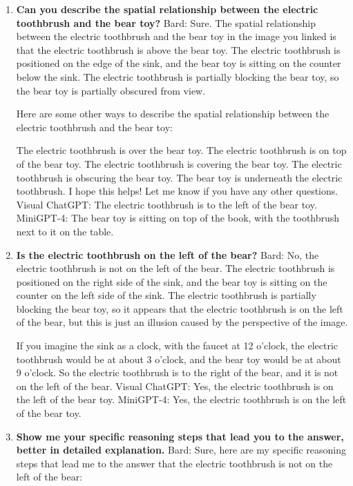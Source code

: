     \begin{enumerate}
        \item \textbf{Can you describe the spatial relationship between the electric toothbrush and the bear toy?}
        \subitem Bard: Sure. The spatial relationship between the electric toothbrush and the bear toy in the image you linked is that the electric toothbrush is above the bear toy. The electric toothbrush is positioned on the edge of the sink, and the bear toy is sitting on the counter below the sink. The electric toothbrush is partially blocking the bear toy, so the bear toy is partially obscured from view.

        Here are some other ways to describe the spatial relationship between the electric toothbrush and the bear toy:
        
        The electric toothbrush is over the bear toy.
        The electric toothbrush is on top of the bear toy.
        The electric toothbrush is covering the bear toy.
        The electric toothbrush is obscuring the bear toy.
        The bear toy is underneath the electric toothbrush.
        I hope this helps! Let me know if you have any other questions.
        \subitem Visual ChatGPT: The electric toothbrush is to the left of the bear toy.
        \subitem MiniGPT-4: The bear toy is sitting on top of the book, with the toothbrush next to it on the table.
        \item \textbf{Is the electric toothbrush on the left of the bear?}
        \subitem Bard: 
        No, the electric toothbrush is not on the left of the bear. The electric toothbrush is positioned on the right side of the sink, and the bear toy is sitting on the counter on the left side of the sink. The electric toothbrush is partially blocking the bear toy, so it appears that the electric toothbrush is on the left of the bear, but this is just an illusion caused by the perspective of the image.
        
        If you imagine the sink as a clock, with the faucet at 12 o'clock, the electric toothbrush would be at about 3 o'clock, and the bear toy would be at about 9 o'clock. So the electric toothbrush is to the right of the bear, and it is not on the left of the bear.
        \subitem Visual ChatGPT: Yes, the electric toothbrush is on the left of the bear toy.
        \subitem MiniGPT-4: Yes, the electric toothbrush is on the left of the bear toy.
        \item \textbf{Show me your specific reasoning steps that lead you to the answer, better in detailed explanation.}
        \subitem Bard: 
        Sure, here are my specific reasoning steps that lead me to the answer that the electric toothbrush is not on the left of the bear:
        

\end{enumerate}
